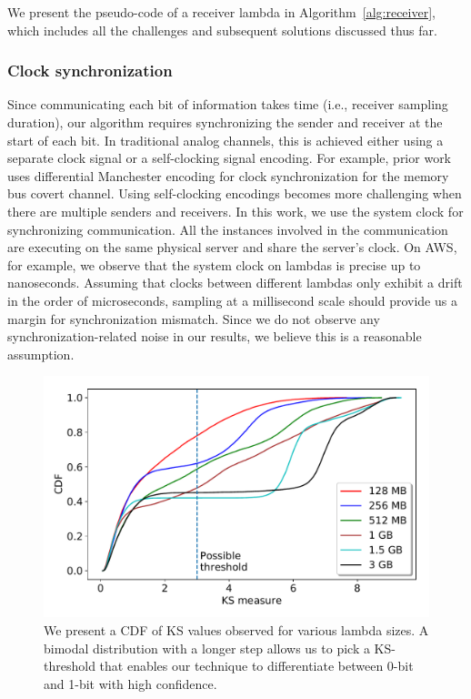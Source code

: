 We present the pseudo-code of a receiver lambda in Algorithm~\ref{alg:receiver},
which includes all the challenges and subsequent solutions discussed thus
far.

\subsubsection{Clock synchronization} 
Since communicating each bit of information takes time (i.e., receiver sampling
duration), our algorithm requires synchronizing the sender and receiver at the start
of each bit. In traditional analog channels, this is achieved either using a
separate clock signal or a self-clocking signal encoding. For example, prior
work~\cite{whispers} uses differential Manchester encoding for clock
synchronization for the memory bus covert channel. Using self-clocking encodings
becomes more challenging when there are multiple senders and receivers. In this
work, we use the system clock for synchronizing communication.  All the
instances involved in the communication are executing on the same physical
server and share the server's clock. On AWS, for example, we observe that the
system clock on lambdas is precise up to nanoseconds. 
Assuming that clocks between different lambdas only exhibit a drift in the order
of microseconds, sampling at a millisecond scale should provide us a margin for
synchronization mismatch. Since we do not observe any synchronization-related
noise in our results, we believe this is a reasonable assumption.


\begin{figure}[!t]
  \includegraphics[width=.99\linewidth]{fig/ksvalues.pdf}
  \caption{We present a CDF of KS values observed for various lambda sizes. A bimodal distribution 
  with a longer step allows us to pick a KS-threshold that enables our technique to differentiate 
  between 0-bit and 1-bit with high confidence. 
\label{fig:ks_values}}
\end{figure}

